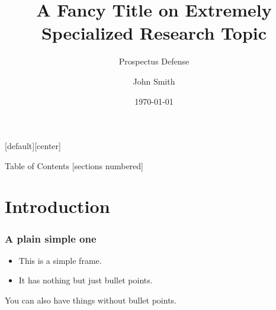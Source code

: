 \documentclass[10pt,xcolor=table]{beamer}
\title{A Fancy Title on Extremely Specialized Research Topic}
\subtitle{Prospectus Defense}
\date{\today}
\author{John Smith}
\begin{document}
{
\maketitle
}

[default][center]

\begin{frame}[plain]{Table of Contents}
  [sections numbered]
  \tableofcontents[hideallsubsections]
\end{frame}

\section{Introduction}
\begin{frame}
  \frametitle{A plain simple one}
  \begin{itemize}
  \item This is a simple frame.
  \item It has nothing but just bullet points.
  \end{itemize}
  You can also have things without bullet points.
\end{frame}
\end{document}
